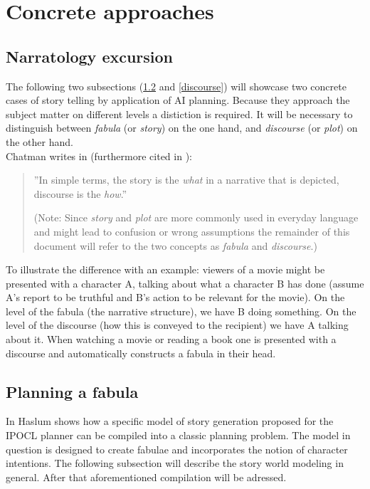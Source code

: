 \section{Concrete approaches}\label{approaches}
\subsection{Narratology excursion}
The following two subsections (\ref{fabula} and \ref{discourse}) will showcase two concrete cases of story telling by application of AI planning. Because they approach the subject matter on different levels a distiction is required. It will be necessary to distinguish between \emph{fabula} (or \emph{story}) on the one hand, and \emph{discourse} (or \emph{plot}) on the other hand.\\
Chatman writes in \cite{Chatman1980} (furthermore cited in \cite{Herman10}):
\begin{quote}
''In simple terms, the story is the \emph{what} in a narrative that is depicted, discourse is the \emph{how}.''

(Note: Since \emph{story} and \emph{plot} are more commonly used in everyday language and might lead to confusion or wrong assumptions the remainder of this document will refer to the two concepts as \emph{fabula} and \emph{discourse}.)
\end{quote}
To illustrate the difference with an example: viewers of a movie might be presented with a character A, talking about what a character B has done (assume A's report to be truthful and B's action to be relevant for the movie). On the level of the fabula (the narrative structure), we have B doing something. On the level of the discourse (how this is conveyed to the recipient) we have A talking about it. When watching a movie or reading a book one is presented with a discourse and automatically constructs a fabula in their head.
\subsection{Planning a fabula}\label{fabula}
In \cite{Haslum14} Haslum shows how a specific model of story generation proposed for the IPOCL planner \cite{Riedl10} can be compiled into a classic planning problem. The model in question is designed to create fabulae and incorporates the notion of character intentions. The following subsection will describe the story world modeling in general. After that aforementioned compilation will be adressed.

